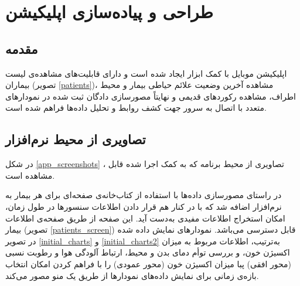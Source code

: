 \section{طراحی و پیاده‌سازی اپلیکیشن}
\subsection{مقدمه}
اپلیکیشن موبایل با کمک ابزار  ایجاد شده است و دارای قابلیت‌های مشاهده‌ی لیست بیماران (تصویر \ref{patients})، مشاهده آخرین وضعیت علائم حیاطی بیمار و محیط اطراف، مشاهده رکوردهای قدیمی و نهایتاً مصورسازی دادگان ثبت شده در نمودارهای متعدد با اتصال به سرور جهت کشف روابط و تحلیل داده‌ها فراهم شده است.

\subsection{تصاویری از محیط نرم‌افزار}
در شکل
\ref{app_screenshots}
، تصاویری از محیط برنامه که به کمک  اجرا شده قابل مشاهده است.

در راستای مصورسازی داده‌ها با استفاده از کتاب‌خانه‌ی  صفحه‌ای برای هر بیمار به نرم‌افزار اضافه شد که با در کنار هم قرار دادن اطلاعات سنسورها در طول زمان، امکان استخراج اطلاعات مفیدی به‌دست آید. این صفحه از طریق صفحه‌ی اطلاعات بیمار (تصویر \ref{patients_screen}) قابل دسترسی می‌باشد. نمودارهای نمایش داده شده در تصویر
\ref{initial_charts}
و
\ref{initial_charts2}
به‌ترتیب، اطلاعات مربوط به میزان اکسیژن خون، و بررسی توأم دمای بدن و محیط، ارتباط آلودگی هوا و رطوبت نسبی (محور افقی) پبا میزان اکسیژن خون (محور عمودی) را با فراهم کردن امکان انتخاب بازه‌ی زمانی برای نمایش داده‌های نمودارها از طریق یک منو مصور می‌کند.


